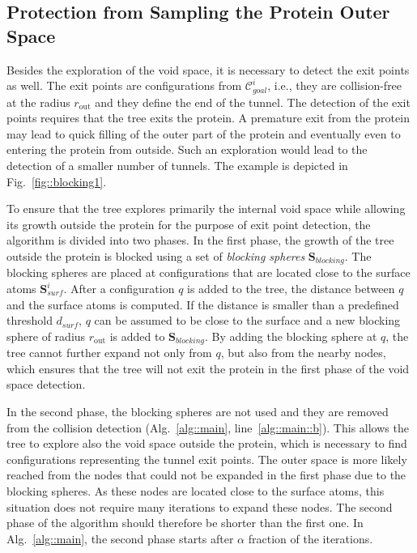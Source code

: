 \documentclass[usletter, 10pt, conference]{svjour3}      %
\def\CG{\mathcal{C}_{goal}}
\def\dts{d_{surf}}
\def\gprobe{r_{\mathrm{out}}}
\def\SB{\mathbf{S}_{blocking}}
\def\SSA{\mathbf{S}_{surf}}
\begin{document}
\subsection{Protection from Sampling the Protein Outer Space}

Besides the exploration of the void space, it is necessary to detect the exit points as well.
The exit points are configurations from $\CG^i$, i.e., they are collision-free at the radius $\gprobe$ and they define the end of the tunnel.
The detection of the exit points requires that the tree exits the protein.
A premature exit from the protein may lead to quick filling of the outer part of the protein and eventually even to entering the protein from outside. 
Such an exploration would lead to the detection of a smaller number of tunnels.
The example is depicted in Fig.~\ref{fig::blocking1}.

To ensure that the tree explores primarily the internal void space while allowing its growth outside the protein for the purpose of exit point detection, the algorithm is divided into two phases.
In the first phase, the growth of the tree outside the protein is blocked using a set of {\sl blocking spheres} $\SB$.
The blocking spheres are placed at configurations that are located close to the surface atoms $\SSA^i$.
After a configuration $q$ is added to the tree, the distance between $q$ and the surface atoms is computed.
If the distance is smaller than a predefined threshold $\dts$, $q$ can be assumed to be close to the surface and a new blocking sphere of radius $\gprobe$ is added to $\SB$.
By adding the blocking sphere at $q$, the tree cannot further expand not only from $q$, but also from the nearby nodes, which ensures that the tree will not exit the protein in the first phase of the void space detection.

In the second phase, the blocking spheres are not used and they are removed from the collision detection (Alg.~\ref{alg::main}, line~\ref{alg::main::b}).
This allows the tree to explore also the void space outside the protein, which is necessary to find configurations representing the tunnel exit points.
The outer space is more likely reached from the nodes that could not be expanded in the first phase due to the blocking spheres.
As these nodes are located close to the surface atoms, this situation does not require many iterations to expand these nodes.
The second phase of the algorithm should therefore be shorter than the first one.
In Alg.~\ref{alg::main}, the second phase starts after $\alpha$ fraction of the iterations.
\end{document}
